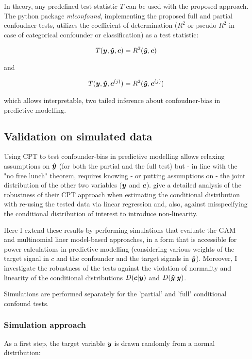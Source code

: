 \documentclass{article}
\begin{document}
In theory, any predefined test statistic $T$ can be used with the proposed approach. The python package \emph{mlconfound}, implementing the proposed full and partial confoudner tests, utilizes the coefficient of determination ($R^2$ or pseudo $R^2$ in case of categorical confounder or classification\citep{starkweather2011multinomial}) as a test statistic:

$$T(\boldsymbol{y}, \boldsymbol{\hat{y}}, \boldsymbol{c}) = R^2(\boldsymbol{\hat{y}}, \boldsymbol{c})$$ 

and

$$T(\boldsymbol{y}, \boldsymbol{\hat{y}}, \boldsymbol{c}^{(j)}) = R^2(\boldsymbol{\hat{y}}, \boldsymbol{c}^{(j)})$$ 

which allows interpretable, two tailed inference about confoudner-bias in predictive modelling.


\subsection{Validation on simulated data}

Using CPT to test confounder-bias in predictive modelling allows relaxing assumptions on $\boldsymbol{\hat{y}}$ (for both the partial and the full test) but - in line with the "no free lunch" theorem, requires knowing - or putting assumptions on - the joint distribution of the other two variables ($\boldsymbol{y}$ and $\boldsymbol{c}$). 
\cite{berrett2020conditional} give a detailed analysis of the robustness of their CPT approach when estimating the conditional distribution with re-using the tested data via linear regression and, also, against misspecifying the conditional distribution of interest to introduce non-linearity.

Here I extend these results by performing simulations that evaluate the GAM- and multinomial liner model-based approaches, in a form that is accessible for power calculations in predictive modelling (considering various weights of the target signal in $c$ and the confounder and the target signals in $\boldsymbol{\hat{y}}$).
Moreover, I investigate the robustness of the tests against the violation of normality and linearity of the conditional distributions $D(\boldsymbol{c}|\boldsymbol{y})$ and $D(\boldsymbol{\hat{y}}|\boldsymbol{y})$.

Simulations are performed separately for the 'partial' and 'full' conditional confound tests.

\subsubsection*{Simulation approach}
As  a first step, the target variable $\boldsymbol{y}$ is drawn randomly from a normal distribution:
\end{document}
